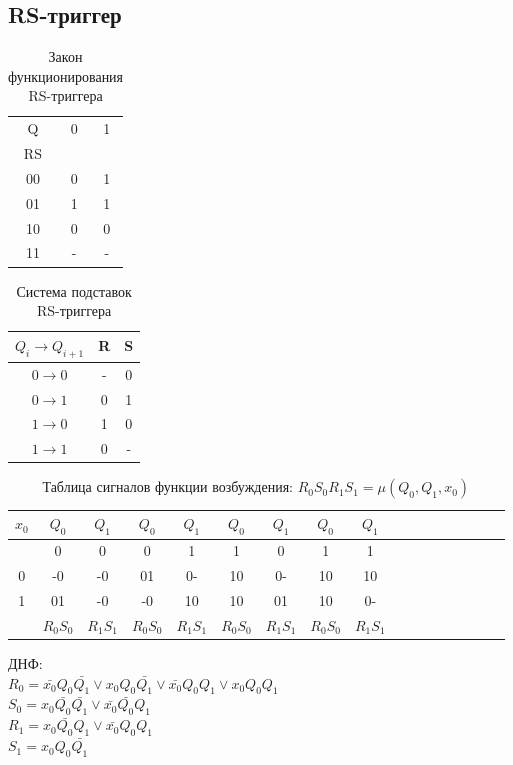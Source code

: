 \documentclass[a4paper,10pt]{article}
\begin{document}
	\subsection*{RS-триггер}
    		\begin{table}[h!]
				\center
    			\begin{tabular}{|c|c|c|}
					\hline
					 Q  & 0 & 1 \\
					 RS &   &   \\ \hline
					 00 & 0 & 1 \\ \hline
					 01 & 1 & 1 \\ \hline
					 10 & 0 & 0 \\ \hline
					 11 & - & - \\ \hline
				\end{tabular}
    			\caption{Закон функционирования RS-триггера}
    		\end{table}
    		\begin{table}[h!]
				\center
    			\begin{tabular}{|c|c|c|}
					\hline
            $Q_i \to Q_{i+1}$  & R & S \\ \hline
					 $0 \to 0$ & - & 0 \\ \hline
					 $0 \to 1$ & 0 & 1 \\ \hline
					 $1 \to 0$ & 1 & 0 \\ \hline
					 $1 \to 1$ & 0 & - \\ \hline
				\end{tabular}
    			\caption{Система подставок RS-триггера}
    		\end{table}
    		\begin{table}[h!]
				\center
        		\begin{tabular}{|c||c|c||c|c||c|c||c|c||c|c||c|c||c|c||c|c|}
				 \hline
			     $x_0$ &  $Q_0$ & $Q_1$  &  $Q_0$ & $Q_1$  &  $Q_0$ & $Q_1$  &  $Q_0$ & $Q_1$ \\ \hline
					   &    0   &   0    &    0   &   1    &    1   &   0    &    1   &   1   \\ \hline
					0  &   -0   &  -0    &   01   &  0-    &   10   &  0-    &   10   &  10   \\ \hline
					1  &   01   &  -0    &   -0   &  10    &   10   &  01    &   10   &  0-   \\ \hline
					   &$R_0S_0$&$R_1S_1$&$R_0S_0$&$R_1S_1$&$R_0S_0$&$R_1S_1$&$R_0S_0$&$R_1S_1$ \\ \hline
        		\end{tabular}
    			\caption{Таблица сигналов функции возбуждения: $R_0S_0R_1S_1 = \mu(Q_0,Q_1,x_0)$}
    		\end{table}
		ДНФ: \\
		$R_0 = \bar{x_0} Q_0 \bar{Q_1} \lor x_0 Q_0 \bar{Q_1} \lor \bar{x_0} Q_0 Q_1 \lor x_0 Q_0 Q_1$ \\
		$S_0 = x_0 \bar{Q_0} \bar{Q_1} \lor \bar{x_0} \bar{Q_0} Q_1$ \\
		$R_1 = x_0 \bar{Q_0} Q_1 \lor \bar{x_0} Q_0 Q_1$ \\
		$S_1 = x_0 Q_0 \bar{Q_1}$ \\
		
\end{document}
